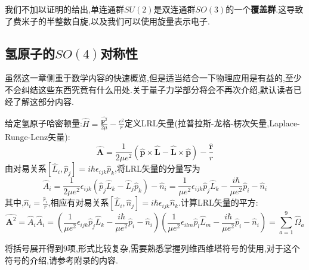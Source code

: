 我们不加以证明的给出,单连通群$SU(2)$是双连通群$SO(3)$的一个\textbf{覆盖群}.这导致了费米子的半整数自旋,以及我们可以使用旋量表示电子.


\subsection{氢原子的$SO(4)$对称性}
虽然这一章侧重于数学内容的快速概览,但是适当结合一下物理应用是有益的,至少不会纠结这些东西究竟有什么用处.关于量子力学部分将会不再次介绍,默认读者已经了解这部分内容.

给定氢原子哈密顿量:$\displaystyle\hat{H}=\frac{\hat{\bm{p}^2}}{2\mu}-\frac{e^2}{r}$定义LRL矢量(拉普拉斯-龙格-楞次矢量,Laplace-Runge-Lenz矢量):
\begin{equation}
    \displaystyle \hat{\bm{A}}=\frac{1}{2\mu e^2}(\hat{\bm{p}}\times\hat{\bm{L}}-\hat{\bm{L}}\times\hat{\bm{p}})-\frac{\hat{\bm{r}}}{r}
\end{equation}
由对易关系$\displaystyle[\hat{L}_i,\hat{p}_j]=i\hbar \epsilon _{ijk}\hat{p}_k$,将LRL矢量的分量写为
\begin{equation}
    \displaystyle\hat{A}_i=\frac{1}{2\mu e^2}\epsilon _{ijk}(\hat{p}_j\hat{L}_k-  \hat{L}_j\hat{p}_k)-\hat{n}_i   =\frac{1}{\mu e^2}\epsilon _{ijk}\hat{p}_j\hat{L}_k -\frac{i\hbar }{\mu e^2}\hat{p}_i-\hat{n}_i
\end{equation}
其中,$\displaystyle\hat{n}_i=\frac{\hat{r}_i}{r}$,相应有对易关系$[\hat{L}_i,\hat{n}_j  ]=i\hbar \epsilon _{ijk}\hat{n}_k $.计算LRL矢量的平方:
\begin{equation}
    \displaystyle\hat{\bm{A}^2}=\hat{A}_i \hat{A}_i =(\frac{1}{\mu e^2}\epsilon _{ijk}\hat{p}_j\hat{L}_k -\frac{i\hbar }{\mu e^2}\hat{p}_i-\hat{n}_i)(\frac{1}{\mu e^2}\epsilon _{ilm}\hat{p}_l\hat{L}_m -\frac{i\hbar }{\mu e^2}\hat{p}_i-\hat{n}_i)=\sum_{a=1}^{9}\hat{\Omega }  _a
\end{equation}

将括号展开得到$ 9 $项,形式比较复杂,需要熟悉掌握列维西维塔符号的使用,对于这个符号的介绍,请参考附录的内容.

